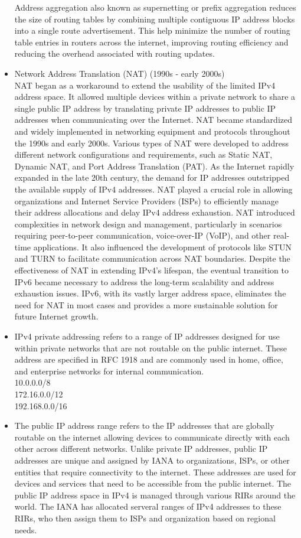 \documentclass{article}
\begin{document}
\begin{itemize}
		Address aggregation also known as supernetting or prefix aggregation reduces the size of routing tables by combining multiple contiguous IP address blocks into a single route advertisement. This help minimize the number of routing table entries in routers across the internet, improving routing efficiency and reducing the overhead associated with routing updates.
	\item[] Network Address Translation (NAT) (1990s - early 2000s)\\
		NAT began as a workaround to extend the usability of the limited IPv4 address space. It allowed multiple devices within a private network to share a single public IP address by translating private IP addresses to public IP addresses when communicating over the Internet. NAT became standardized and widely implemented in networking equipment and protocols throughout the 1990s and early 2000s. Various types of NAT were developed to address different network configurations and requirements, such as Static NAT, Dynamic NAT, and Port Address Translation (PAT). As the Internet rapidly expanded in the late 20th century, the demand for IP addresses outstripped the available supply of IPv4 addresses. NAT played a crucial role in allowing organizations and Internet Service Providers (ISPs) to efficiently manage their address allocations and delay IPv4 address exhaustion. NAT introduced complexities in network design and management, particularly in scenarios requiring peer-to-peer communication, voice-over-IP (VoIP), and other real-time applications. It also influenced the development of protocols like STUN and TURN to facilitate communication across NAT boundaries. Despite the effectiveness of NAT in extending IPv4's lifespan, the eventual transition to IPv6 became necessary to address the long-term scalability and address exhaustion issues. IPv6, with its vastly larger address space, eliminates the need for NAT in most cases and provides a more sustainable solution for future Internet growth.
	\item[] IPv4 private addressing refers to a range of IP addresses designed for use within private networks that are not routable on the public internet. These address are specified in RFC 1918 and are commonly used in home, office, and enterprise networks for internal communication.\\
		10.0.0.0/8\\
		172.16.0.0/12\\
		192.168.0.0/16
	\item[] The public IP address range refers to the IP addresses that are globally routable on the internet allowing devices to communicate directly with each other across different networks. Unlike private IP addresses, public IP addresses are unique and assigned by IANA to organizations, ISPs, or other entities that require connectivity to the internet. These addresses are used for devices and services that need to be accessible from the public internet. The public IP address space in IPv4 is managed through various RIRs around the world. The IANA has allocated serveral ranges of IPv4 addresses to these RIRs, who then assign them to ISPs and organization based on regional needs.\\

\end{itemize}
\end{document}
